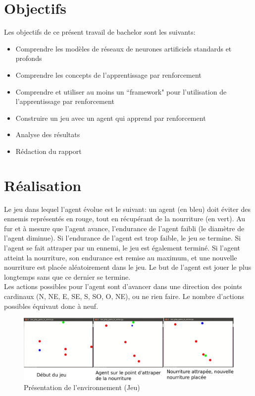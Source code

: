 \documentclass[11pt,a4paper]{report}
\begin{document}
  \section{Objectifs}
  
  \par Les objectifs de ce présent travail de bachelor sont les suivants: 
  
  \renewcommand{\labelitemi}{\textbullet}
  \begin{itemize}
  \item Comprendre les modèles de réseaux de neurones artificiels standards et profonds
  \item Comprendre les concepts de l'apprentissage par renforcement
  \item Comprendre et utiliser au moins un ``framework" pour l’utilisation de l'apprentissage par renforcement
  \item Construire un jeu avec un agent qui apprend par renforcement
  \item Analyse des résultats 
  \item Rédaction du rapport
  \end{itemize}
  
  \section{Réalisation}
  
  \par Le jeu dans lequel l'agent évolue est le suivant: un agent (en bleu) doit éviter des ennemis représentés en rouge, tout en récupérant de la nourriture (en vert). Au fur et à mesure que l'agent avance, l'endurance de l'agent faibli (le diamètre de l'agent diminue). Si l'endurance de l'agent est trop faible, le jeu se termine. Si l'agent se fait attraper par un ennemi, le jeu est également terminé. Si l'agent atteint la nourriture, son endurance est remise au maximum, et une nouvelle nourriture est placée aléatoirement dans le jeu. Le but de l'agent est jouer le plus longtemps sans que ce dernier se termine.\\
  Les actions possibles pour l'agent sont d'avancer dans une direction des points cardinaux (N, NE, E, SE, S, SO, O, NE), ou ne rien faire. Le nombre d'actions possibles équivaut donc à neuf. 
  
   \begin{figure}[!h]
   \center
   \includegraphics[scale=0.2]{ressources/presentation_jeu.png}
   \caption{Présentation de l'environnement (Jeu)}
   \end{figure} 
  
\end{document}
